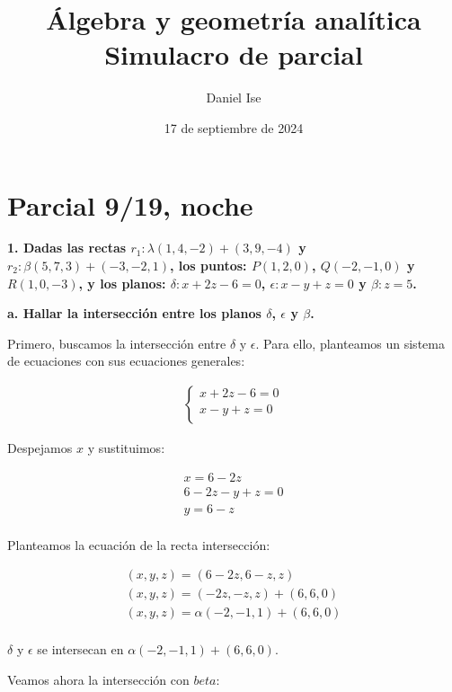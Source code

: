 \documentclass[12pt]{article}
\title{Álgebra y geometría analítica\\Simulacro de parcial}
\author{Daniel Ise}
\date{17 de septiembre de 2024}
\begin{document}
\maketitle

\tableofcontents

\pagebreak

\section{Parcial 9/19, noche}

\textbf{1. Dadas las rectas \(r_{1}: \lambda (1,4,-2) + (3,9,-4)\)
  y \(r_{2}: \beta(5,7,3) + (-3,-2,1)\),
  los puntos: \(P (1,2,0)\), \(Q (-2,-1,0)\) y \(R (1,0,-3)\),
  y los planos: \(\delta: x + 2z - 6 = 0\), \(\epsilon: x - y + z = 0\)
  y \(\beta: z = 5\).}

\textbf{a. Hallar la intersección entre los planos \(\delta\), \(\epsilon\)
  y \(\beta\).}

Primero, buscamos la intersección entre \(\delta\) y \(\epsilon\).
Para ello, planteamos un sistema de ecuaciones con sus ecuaciones generales:

\begin{align*}
  \begin{cases}
    x + 2z - 6 = 0 \\
    x - y + z = 0  \\
  \end{cases}
\end{align*}

Despejamos \(x\) y sustituimos:

\begin{align*}
  x = 6 - 2z         \\
  6 - 2z - y + z = 0 \\
  y = 6 - z          \\
\end{align*}

Planteamos la ecuación de la recta intersección:

\begin{align*}
  (x,y,z) = (6 - 2z, 6-z, z)              \\
  (x,y,z) = (-2z, -z, z) + (6, 6, 0)      \\
  (x,y,z) = \alpha(-2, -1, 1) + (6, 6, 0) \\
\end{align*}

\(\delta\) y \(\epsilon\) se intersecan en \(\alpha(-2, -1, 1) + (6, 6, 0)\).

Veamos ahora la intersección con \(beta\):
\end{document}
